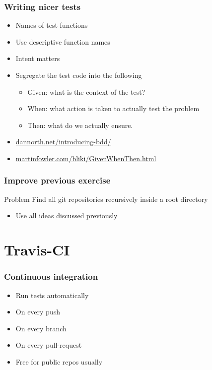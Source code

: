 \documentclass[14pt,compress]{beamer}
\begin{document}
\begin{frame}
  \frametitle{Writing nicer tests}
  \begin{itemize}
  \item Names of test functions
  \item Use descriptive function names
  \item Intent matters
  \item Segregate the test code into the following

    \begin{itemize}
    \item Given: what is the context of the test?
    \item When: what action is taken to actually test the problem
    \item Then: what do we actually ensure.
    \end{itemize}

  \item \url{dannorth.net/introducing-bdd/}
  \item \url{martinfowler.com/bliki/GivenWhenThen.html}
  \end{itemize}
\end{frame}

\begin{frame}
  \frametitle{Improve previous exercise}
  \begin{block}{Problem}
  Find all git repositories recursively inside a root directory
\end{block}
\begin{itemize}
  \item Use all ideas discussed previously
\end{itemize}

\end{frame}


\section{Travis-CI}

\begin{frame}
  \frametitle{Continuous integration}
  \begin{itemize}
  \item Run tests automatically
  \item On every push
  \item On every branch
  \item On every pull-request
  \item Free for public repos usually
  \end{itemize}
\end{frame}
\end{document}
